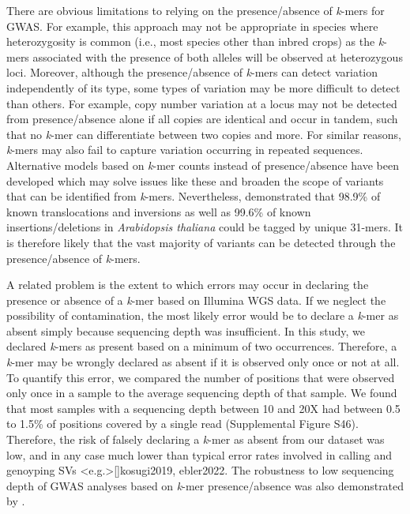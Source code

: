 \documentclass{article}
\begin{document}
There are obvious limitations to relying on the presence/absence of
\emph{k}-mers for GWAS. For example, this approach may not be appropriate in
species where heterozygosity is common (i.e., most species other than inbred
crops) as the \emph{k}-mers associated with the presence of both alleles will
be observed at heterozygous loci. Moreover, although the presence/absence of
\emph{k}-mers can detect variation independently of its type, some types of
variation may be more difficult to detect than others.  For example, copy
number variation at a locus may not be detected from presence/absence alone if
all copies are identical and occur in tandem, such that no \textit{k}-mer can
differentiate between two copies and more. For similar reasons, \emph{k}-mers
may also fail to capture variation occurring in repeated sequences. Alternative
models based on \emph{k}-mer counts instead of presence/absence have been
developed  which may solve issues like these and
broaden the scope of variants that can be identified from \emph{k}-mers.
Nevertheless,  demonstrated that 98.9\% of known
translocations and inversions as well as 99.6\% of known insertions/deletions
in \textit{Arabidopsis thaliana} could be tagged by unique 31-mers. It is
therefore likely that the vast majority of variants can be detected through the
presence/absence of \textit{k}-mers.

A related problem is the extent to which errors may occur in declaring the
presence or absence of a \textit{k}-mer based on Illumina WGS data. If we
neglect the possibility of contamination, the most likely error would be to
declare a \textit{k}-mer as absent simply because sequencing depth was
insufficient. In this study, we declared \textit{k}-mers as present
based on a minimum of two occurrences. Therefore, a \textit{k}-mer may be
wrongly declared as absent if it is observed only once or not at all.  To
quantify this error, we compared the number of positions that were
observed only once in a sample to the average sequencing depth of that sample.
We found that most samples with a sequencing depth between 10 and 20X had
between 0.5 to 1.5\% of positions covered by a single read (Supplemental Figure S46).
Therefore, the risk of falsely declaring a \textit{k}-mer as absent from
our dataset was low, and in any case much lower than typical error rates
involved in calling and genoyping SVs \shortcite<e.g.>[]{kosugi2019, ebler2022}.
The robustness to low sequencing depth of GWAS analyses based on \textit{k}-mer
presence/absence was also demonstrated by .
\end{document}
